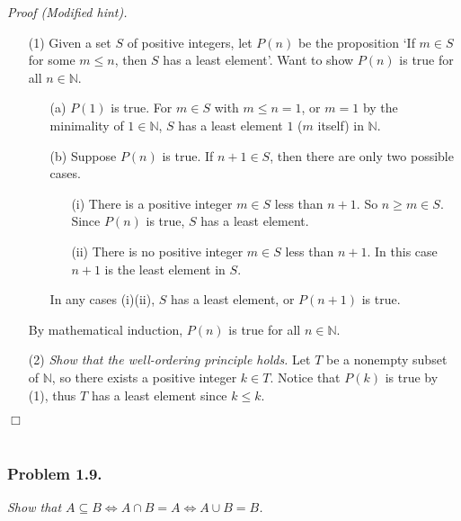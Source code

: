 \documentclass{article}
\begin{document}
\emph{Proof (Modified hint).}
\begin{enumerate}
\item[(1)]
Given a set $S$ of positive integers,
let $P(n)$ be the proposition
`If $m \in S$ for some $m \leq n$, then $S$ has a least element'.
Want to show $P(n)$ is true for all $n \in \mathbb{N}$.
\begin{enumerate}
\item[(a)]
$P(1)$ is true.
For $m \in S$ with $m \leq n = 1$,
or $m = 1$ by the minimality of $1 \in \mathbb{N}$,
$S$ has a least element $1$ ($m$ itself) in $\mathbb{N}$.
\item[(b)]
Suppose $P(n)$ is true.
If $n+1 \in S$, then there are only two possible cases.
  \begin{enumerate}
  \item[(i)]
  There is a positive integer $m \in S$ less than $n+1$.
  So $n \geq m \in S$.
  Since $P(n)$ is true, $S$ has a least element.
  \item[(ii)]
  There is no positive integer $m \in S$ less than $n+1$.
  In this case $n+1$ is the least element in $S$.
  \end{enumerate}
  In any cases (i)(ii), $S$ has a least element, or $P(n+1)$ is true.
\end{enumerate}
By mathematical induction, $P(n)$ is true for all $n \in \mathbb{N}$.
\item[(2)]
\emph{Show that the well-ordering principle holds.}
Let $T$ be a nonempty subset of $\mathbb{N}$,
so there exists a positive integer $k \in T$.
Notice that $P(k)$ is true by (1),
thus $T$ has a least element since $k \leq k$.
\end{enumerate}
$\Box$ \\\\






\subsubsection*{Problem 1.9.}
\emph{Show that
$A \subseteq B
\Leftrightarrow A \cap B = A
\Leftrightarrow A \cup B = B$.} \\
\end{document}
